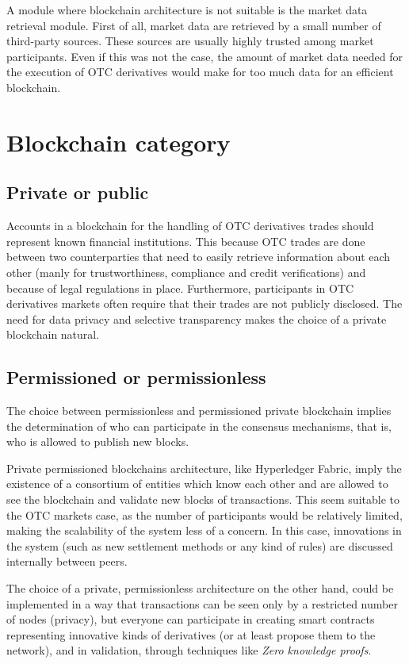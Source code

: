 \documentclass{article}
\begin{document}
A module where blockchain architecture is not suitable is the market data retrieval module. First of all, market data are retrieved by a small number of third-party sources. These sources are usually highly trusted among market participants. Even if this was not the case, the amount of market data needed for the execution of OTC derivatives would make for too much data for an efficient blockchain.

\section{Blockchain category}

\subsection{Private or public}
Accounts in a blockchain for the handling of OTC derivatives trades should represent known financial institutions. This because OTC trades are done between two counterparties that need to easily retrieve information about each other (manly for trustworthiness, compliance and credit verifications) and because of legal regulations in place.
Furthermore, participants in OTC derivatives markets often require that their trades are not publicly disclosed.
The need for data privacy and selective transparency makes the choice of a private blockchain natural.

\subsection{Permissioned or permissionless}
The choice between permissionless and permissioned private blockchain implies the determination of who can participate in the consensus mechanisms, that is, who is allowed to publish new blocks.

Private permissioned blockchains architecture, like Hyperledger Fabric, imply the existence of a consortium of entities which know each other and are allowed to see the blockchain and validate new blocks of transactions. This seem suitable to the OTC markets case, as the number of participants would be relatively limited, making the scalability of the system less of a concern. In this case, innovations in the system (such as new settlement methods or any kind of rules) are discussed internally between peers.

The choice of a private, permissionless architecture on the other hand, could be implemented in a way that transactions can be seen only by a restricted number of nodes (privacy), but everyone can participate in creating smart contracts representing innovative kinds of derivatives (or at least propose them to the network), and in validation, through techniques like \textit{Zero knowledge proofs}.
\end{document}
